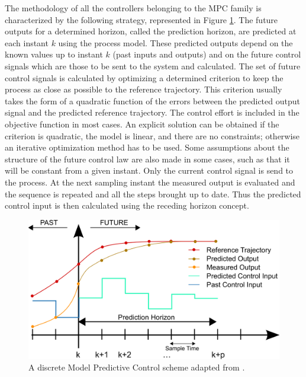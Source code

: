The methodology of all the controllers belonging to the MPC family is characterized by the following strategy, represented in Figure \ref{fig:mpc_theory}. The future outputs for a  determined horizon, called  the  prediction horizon, are predicted at each instant $k$ using the process model. These predicted outputs depend on the known values up to instant $k$ (past inputs and outputs) and on the future control signals which are those to be sent to the system and calculated. The set of future control signals is calculated by optimizing a determined criterion to keep the process as close as possible to the reference trajectory. This criterion usually takes the form of a quadratic function of the errors between the predicted output signal and the predicted reference trajectory. The control effort is included in the objective function in most
cases. An explicit solution can be obtained if the criterion is quadratic, the model is linear, and there are no constraints; otherwise an iterative
optimization method has to be used. Some assumptions about the structure of the future control law are also made in some cases, such as that it will be constant from a given instant. Only the current control signal is send to the process. At the next sampling instant the measured output is evaluated and the sequence is repeated and all the steps brought up to date. Thus the predicted control input is then calculated using the receding horizon concept.
\begin{figure}[!h]
	\centering
	\includegraphics[width=\textwidth]{../figure/mpc_theory.png}
	\caption{A discrete Model Predictive Control scheme adapted from \cite{mpctoolbox}.}
	\label{fig:mpc_theory}
\end{figure}

